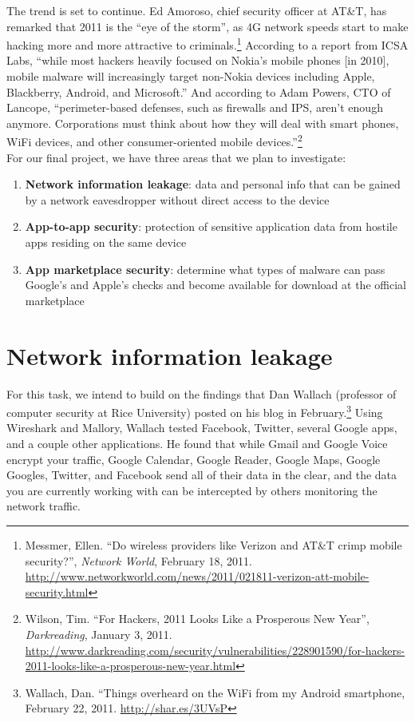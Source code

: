 \documentclass[11pt]{article}
\begin{document}
The trend is set to continue. Ed Amoroso, chief security officer at AT\&T, has remarked that 2011 is the ``eye of the storm'', as 4G network speeds start to make hacking more and more attractive to criminals.\footnote{Messmer, Ellen. ``Do wireless providers like Verizon and AT\&T crimp mobile security?'', \textit{Network World}, February 18, 2011. \url{http://www.networkworld.com/news/2011/021811-verizon-att-mobile-security.html}} According to a report from ICSA Labs, ``while most hackers heavily focused on Nokia's mobile phones [in 2010], mobile malware will increasingly target non-Nokia devices including Apple, Blackberry, Android, and Microsoft.'' And according to Adam Powers, CTO of Lancope, ``perimeter-based defenses, such as firewalls and IPS, aren't enough anymore. Corporations must think about how they will deal with smart phones, WiFi devices, and other consumer-oriented mobile devices.''\footnote{Wilson, Tim. ``For Hackers, 2011 Looks Like a Prosperous New Year'', \textit{Darkreading}, January 3, 2011. \url{http://www.darkreading.com/security/vulnerabilities/228901590/for-hackers-2011-looks-like-a-prosperous-new-year.html}}\\

For our final project, we have three areas that we plan to investigate:
\begin{enumerate}
\item \textbf{Network information leakage}: data and personal info that can be gained by a network eavesdropper without direct access to the device
\item \textbf{App-to-app security}: protection of sensitive application data from hostile apps residing on the same device
\item \textbf{App marketplace security}: determine what types of malware can pass Google's and Apple's checks and become available for download at the official marketplace
\end{enumerate}

\section{Network information leakage}
For this task, we intend to build on the findings that Dan Wallach (professor of computer security at Rice University) posted on his blog in February.\footnote{Wallach, Dan. ``Things overheard on the WiFi from my Android smartphone, February 22, 2011. \url{http://shar.es/3UVsP}} Using Wireshark and Mallory, Wallach tested Facebook, Twitter, several Google apps, and a couple other applications. He found that while Gmail and Google Voice encrypt your traffic, Google Calendar, Google Reader, Google Maps, Google Googles, Twitter, and Facebook send all of their data in the clear, and the data you are currently working with can be intercepted by others monitoring the network traffic.
\end{document}

